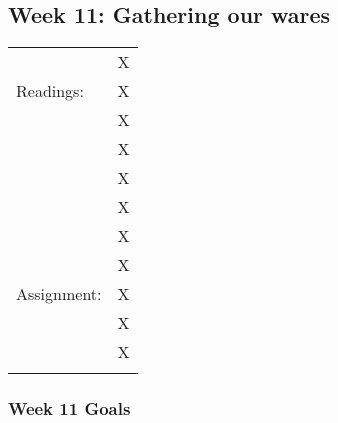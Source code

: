 \documentclass[]{article}
\begin{document}
\subsection{Week 11: Gathering our
wares}\label{week-11-gathering-our-wares}

\begin{longtable}[c]{@{}ll@{}}
\toprule\addlinespace
& X
\\\addlinespace
Readings: & X
\\\addlinespace
& X
\\\addlinespace
& X
\\\addlinespace
& X
\\\addlinespace
& X
\\\addlinespace
& X
\\\addlinespace
& X
\\\addlinespace
Assignment: & X
\\\addlinespace
& X
\\\addlinespace
& X
\\\addlinespace
\bottomrule
\end{longtable}

\subsubsection{Week 11 Goals}\label{week-11-goals}
\end{document}

